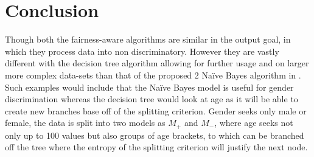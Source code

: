 \section{Conclusion}
\label{Conclusion Section}

Though both the fairness-aware algorithms are similar in the output goal, in which they process data into non discriminatory. However they are vastly different with the decision tree algorithm allowing for further usage and on larger more complex data-sets than that of the proposed 2 Naïve Bayes algorithm in \cite{Naive}. Such examples would include that the Naïve Bayes model is useful for gender discrimination whereas the decision tree would look at age as it will be able to create new branches base off of the splitting criterion. Gender seeks only male or female, the data is split into two models as $M_+$ and $M_-$, where age seeks not only up to 100 values but also groups of age brackets, to which can be branched off the tree where the entropy of the splitting criterion will justify the next node.